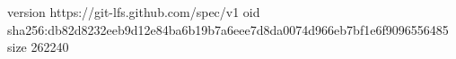 version https://git-lfs.github.com/spec/v1
oid sha256:db82d8232eeb9d12e84ba6b19b7a6eee7d8da0074d966eb7bf1e6f9096556485
size 262240
